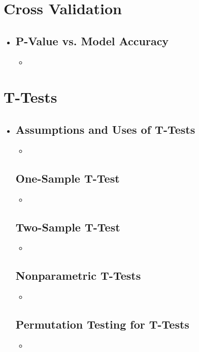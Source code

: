 \section{Cross Validation}
\begin{itemize}
  \item []

  \subsection{P-Value vs. Model Accuracy}
  \begin{itemize}
    \item 
  \end{itemize}
  
\end{itemize}

\section{T-Tests}
\begin{itemize}
  \item []
  
  \subsection{Assumptions and Uses of T-Tests}
  \begin{itemize}
    \item 
  \end{itemize}

  \subsection{One-Sample T-Test}
  \begin{itemize}
    \item 
  \end{itemize}
  
  \subsection{Two-Sample T-Test}
  \begin{itemize}
    \item 
  \end{itemize}

  \subsection{Nonparametric T-Tests}
  \begin{itemize}
    \item 
  \end{itemize}
  
  \subsection{Permutation Testing for T-Tests}
  \begin{itemize}
    \item 
  \end{itemize}
  
  
\end{itemize}
